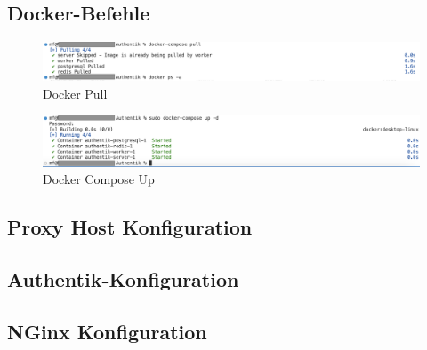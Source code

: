\subsection{Docker-Befehle}
\label{app:dockercommands}
\begin{figure}[ht]
    \centering
    \includegraphics[scale=0.4]{Bilder/Authentik-Doc/DP_00_DockerPull.png}
    \caption{Docker Pull}
  \end{figure}
  
  \vspace{0.5cm} %
  
  \begin{figure}[ht]
    \centering
    \includegraphics[scale=0.4]{Bilder/Authentik-Doc/DP_01_DockerComposeUp.png}
    \caption{Docker Compose Up}
  \end{figure}

\subsection{Proxy Host Konfiguration}
\label{app:ProxyHostConfig}

\subsection{Authentik-Konfiguration}
\label{app:AuthentikConfig}


\subsection{NGinx Konfiguration}
\label{app:CustomNGinxConfig}
\clearpage
\begin{figure}[htb]
    \centering
\end{figure}

